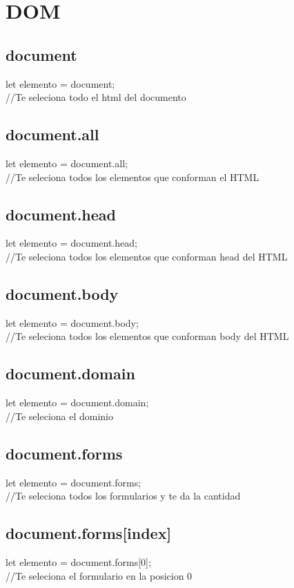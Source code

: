 \documentclass[10pt,a4paper]{article}
\begin{document}
\newpage
\section{DOM}
\subsection{document} 
let elemento = document; \\
//Te seleciona todo el html del documento \\
\subsection{document.all } 
let elemento = document.all; \\
//Te seleciona todos los elementos que conforman el HTML\\
\subsection{document.head} 
let elemento = document.head; \\
//Te seleciona todos los elementos que conforman head del HTML\\
\subsection{document.body} 
let elemento = document.body; \\
//Te seleciona todos los elementos que conforman body del HTML\\
\subsection{document.domain} 
let elemento = document.domain; \\
//Te seleciona el dominio\\
\subsection{document.forms} 
let elemento = document.forms; \\
//Te seleciona todos los formularios y te da la cantidad\\
\subsection{document.forms[index]} 
let elemento = document.forms[0]; \\
//Te seleciona el formulario en la posicion 0\\
\end{document}
